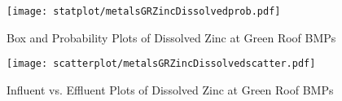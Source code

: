         \begin{figure}[hb]   %
            \centering
            \texttt{[image: statplot/metalsGRZincDissolvedprob.pdf]}
            \caption{Box and Probability Plots of Dissolved Zinc at Green Roof BMPs}
        \end{figure}         %
        
        
        \begin{figure}[hb]   %
            \centering
            \texttt{[image: scatterplot/metalsGRZincDissolvedscatter.pdf]}
            \caption{Influent vs. Effluent Plots of Dissolved Zinc at Green Roof BMPs}
        \end{figure}         %
        \clearpage
        